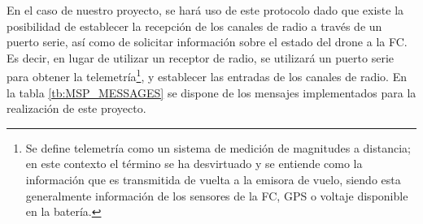 En el caso de nuestro proyecto, se hará uso de este protocolo dado que existe la posibilidad de establecer la recepción de los canales de radio a través de un puerto serie, así como de solicitar información sobre el estado del drone a la FC. Es decir, en lugar de utilizar un receptor de radio, se utilizará un puerto serie para obtener la telemetría\footnote{Se define telemetría como un sistema de medición de magnitudes a distancia; en este contexto el término se ha desvirtuado y se entiende como la información que es transmitida de vuelta a la emisora de vuelo, siendo esta generalmente información de los sensores de la FC, GPS o voltaje disponible en la batería.}, y establecer las entradas de los canales de radio. 
En la tabla \ref{tb:MSP_MESSAGES} se dispone de los mensajes implementados para la realización de este proyecto. 


